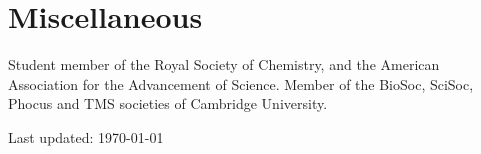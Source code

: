 \documentclass[letterpaper]{article}
\renewenvironment{itemize}{
  \begin{list}{}{
    \setlength{\leftmargin}{1.5em}
  }
}{
  \end{list}
}
\begin{document}


\section*{Miscellaneous}

Student member of the Royal Society of Chemistry, and the American Association for the Advancement of Science. Member of the BioSoc, SciSoc, Phocus and TMS societies of Cambridge University.




\bigskip

\begin{center}
\begin{footnotesize}
Last updated: \today \\
\end{footnotesize}
\end{center}
\end{document}
